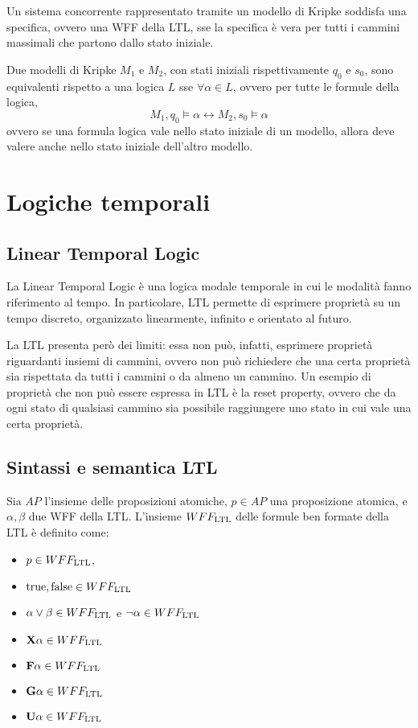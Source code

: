 Un sistema concorrente rappresentato tramite un modello di Kripke soddisfa una
specifica, ovvero una WFF della LTL, sse la specifica è vera per tutti i
cammini massimali che partono dallo stato iniziale.

Due modelli di Kripke $M_1$ e $M_2$, con stati iniziali rispettivamente
$q_0$ e $s_0$, sono equivalenti rispetto a una logica $L$ sse $\forall \alpha \in L$,
ovvero per tutte le formule della logica,
\[
    M_1, q_0 \vDash \alpha \longleftrightarrow M_2, s_0 \vDash \alpha
\]
ovvero se una formula logica vale nello stato iniziale di un modello, allora
deve valere anche nello stato iniziale dell'altro modello.

\section{Logiche temporali}
\subsection{Linear Temporal Logic}
La Linear Temporal Logic è una logica modale temporale in cui le modalità
fanno riferimento al tempo. In particolare, LTL permette di esprimere
proprietà su un tempo discreto, organizzato linearmente, infinito
e orientato al futuro.

La LTL presenta però dei limiti: essa non può, infatti, esprimere
proprietà riguardanti insiemi di cammini, ovvero non può richiedere
che una certa proprietà sia rispettata da tutti i cammini o da almeno un
cammino.
Un esempio di proprietà che non può essere espressa in LTL è la reset property,
ovvero che da ogni stato di qualsiasi cammino sia possibile raggiungere
uno stato in cui vale una certa proprietà.

\subsection*{Sintassi e semantica LTL}
Sia $AP$ l'insieme delle proposizioni atomiche, $p \in AP$ una proposizione
atomica, e $\alpha, \beta$ due WFF della LTL.
L'insieme $WFF_{\textnormal{LTL}}$ delle formule ben formate della LTL è definito come:
\begin{itemize}
    \item $p \in WFF_{\textnormal{LTL}}$,
    \item $\textnormal{true}, \textnormal{false} \in WFF_{\textnormal{LTL}}$
    \item $\alpha \lor \beta \in WFF_{\textnormal{LTL}}$ e $\lnot \alpha \in WFF_{\textnormal{LTL}}$
    \item $\textnormal{\textbf{X}} \alpha \in WFF_{\textnormal{LTL}}$
    \item $\textnormal{\textbf{F}} \alpha \in WFF_{\textnormal{LTL}}$
    \item $\textnormal{\textbf{G}} \alpha \in WFF_{\textnormal{LTL}}$
    \item $\textnormal{\textbf{U}} \alpha \in WFF_{\textnormal{LTL}}$
\end{itemize}

